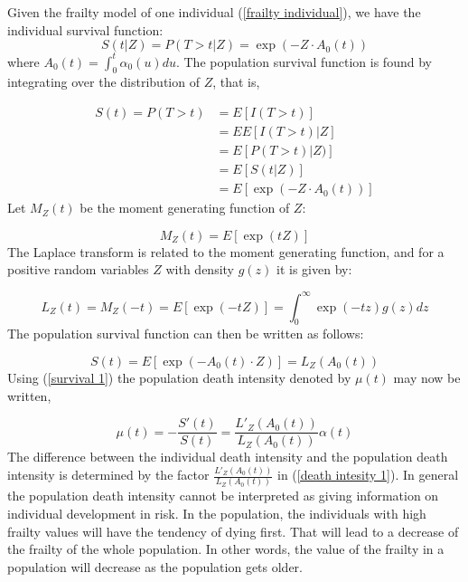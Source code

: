 Given the frailty model of one individual (\ref{frailty individual}), we have the individual survival function:
          \begin{equation}
              S( t | Z ) = P( T > t | Z ) = \exp(-Z \cdot A_{0}(t))
              \label{individual_survival}
          \end{equation}
where $A_{0}(t) = \int_{0}^{t} \alpha_{0}(u)du$.
The population survival function is found by integrating over the distribution of $Z$, that is,


\begin{equation*}
    \begin{split}
      S(t) = P( T>t) & = E[ I(T>t) ] \\
                     & = E { E[ I(T>t)  | Z ] } \\
                     & = E [P( T>t)  | Z  )] \\
                     & = E[S(t  | Z)] \\
                     & = E[\exp(-Z \cdot A_{0}(t)) ]
   \end{split}                 
\end{equation*}
Let $M_{Z}(t)$ be the moment generating function of $Z$: 


\begin{equation*}
    M_{Z}(t) = E[\exp({t Z})]
\end{equation*}
The Laplace transform is related to the moment generating function, and for a positive random variables $Z$ with density $g(z)$ it is given by:

  \begin{equation*}
      L_{Z}(t)  = M_{Z}(-t) = E[\exp({-t Z})]
               =\int_{0}^{\infty} \exp({-t z})g(z)dz 
  \end{equation*}           
The population survival function can then be written as follows:

 \begin{equation}
     S(t)  =  E[\exp(-A_{0}(t) \cdot Z) ]
                 = L_{Z}(A_{0}(t))
    \label{survival 1}
\end{equation}                 
Using (\ref{survival 1}) the population death intensity denoted by $\mu (t)$ may now be written,

 \begin{equation}
 \mu(t)  = - \frac{S'(t)}{S(t)}
                  = \frac{L'_{Z}(A_{0}(t))}{L_{Z}(A_{0}(t))} \alpha(t)
        \label{death intesity 1}          
\end{equation}
The difference between the individual death intensity and the population death intensity is determined by the factor $\frac{L'_{Z}(A_{0}(t))}{L_{Z}(A_{0}(t))}$ in (\ref{death intesity 1}). 
In general the population death intensity cannot be interpreted as giving information on individual development in risk.
In the population, the individuals with high frailty values will have the tendency of dying first.
That will lead to a decrease of the frailty of the whole population. 
In other words, the value of the frailty in a population will decrease as the population gets older. %


